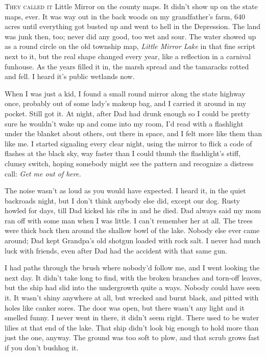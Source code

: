
\lettrine{T}{hey called it} Little Mirror on the county maps. It didn't show up on
the state maps, ever. It was way out in the back woods on my
grandfather's farm, 640 acres until everything got busted up and went to
hell in the Depression. The land was junk then, too; never did any good,
too wet and sour. The water showed up as a round circle on the old
township map, \emph{Little Mirror Lake} in that fine script next to it,
but the real shape changed every year, like a reflection in a carnival
funhouse. As the years filled it in, the marsh spread and the tamaracks
rotted and fell. I heard it's public wetlands now.

When I was just a kid, I found a small round mirror along the state
highway once, probably out of some lady's makeup bag, and I carried it
around in my pocket. Still got it. At night, after Dad had drunk enough
so I could be pretty sure he wouldn't wake up and come into my room, I'd
read with a flashlight under the blanket about others, out there in
space, and I felt more like them than like me. I started signaling every
clear night, using the mirror to flick a code of flashes at the black
sky, way faster than I could thumb the flashlight's stiff, clumsy
switch, hoping somebody might see the pattern and recognize a distress
call: \emph{Get me out of here.}

The noise wasn't as loud as you would have expected. I heard it, in the
quiet backroads night, but I don't think anybody else did, except our
dog. Rusty howled for days, till Dad kicked his ribs in and he died. Dad
always said my mom ran off with some man when I was little. I can't
remember her at all. The trees were thick back then around the shallow
bowl of the lake. Nobody else ever came around; Dad kept Grandpa's old
shotgun loaded with rock salt. I never had much luck with friends, even
after Dad had the accident with that same gun.

I had paths through the brush where nobody'd follow me, and I went
looking the next day. It didn't take long to find, with the broken
branches and torn-off leaves, but the ship had slid into the undergrowth
quite a ways. Nobody could have seen it. It wasn't shiny anywhere at
all, but wrecked and burnt black, and pitted with holes like canker
sores. The door was open, but there wasn't any light and it smelled
funny. I never went in there, it didn't seem right. There used to be
water lilies at that end of the lake. That ship didn't look big enough
to hold more than just the one, anyway. The ground was too soft to plow,
and that scrub grows fast if you don't bushhog it.

